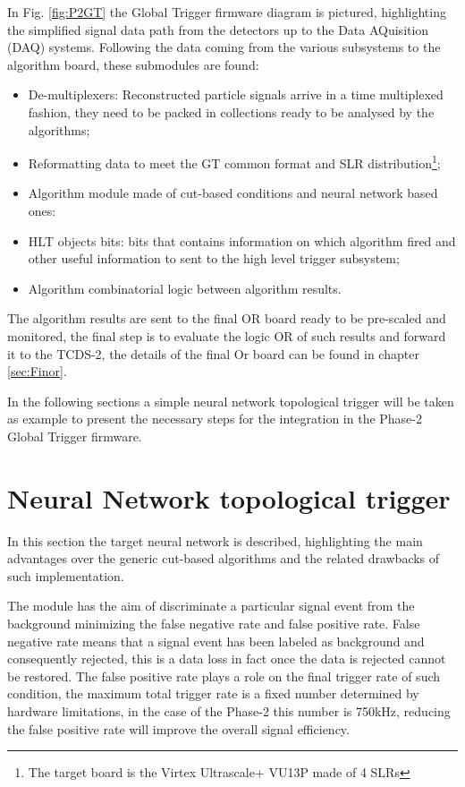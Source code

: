 \documentclass[../../main.tex]{subfiles}
\begin{document}
In Fig. \ref{fig:P2GT} the Global Trigger firmware diagram is pictured, highlighting the simplified signal data path from the detectors up to the Data AQuisition (DAQ) systems. Following the data coming from the various subsystems to the algorithm board, these submodules are found:
\begin{itemize}
    \item De-multiplexers: Reconstructed particle signals arrive in a time multiplexed fashion, they need to be packed in collections ready to be analysed by the algorithms;
    \item Reformatting data to meet the GT common format and SLR distribution\footnote{The target board is the Virtex Ultrascale+ VU13P made of 4 SLRs};
    \item Algorithm module made of cut-based conditions and neural network based ones:
    \item HLT objects bits: bits that contains information on which algorithm fired and other useful information to sent to the high level trigger subsystem;
    \item Algorithm combinatorial logic between algorithm results.
\end{itemize}
The algorithm results are sent to the final OR board ready to be pre-scaled and monitored, the final step is to evaluate the logic OR of such results and forward it to the TCDS-2, the details of the final Or board can be found in chapter \ref{sec:Finor}.



In the following sections a simple neural network topological trigger will be taken as example to present the necessary steps for the integration in the Phase-2 Global Trigger firmware. 
    
    
\section{Neural Network topological trigger}
\label{sec:P2GT_NN}

In this section the target neural network is described, highlighting the main advantages over the generic cut-based algorithms and the related drawbacks of such implementation.  

The module has the aim of discriminate a particular signal event from the background minimizing the false negative rate and false positive rate. False negative rate means that a signal event has been labeled as background and consequently rejected, this is a data loss in fact once the data is rejected cannot be restored. The false positive rate plays a role on the final trigger rate of such condition, the maximum total trigger rate is a fixed number determined by hardware limitations, in the case of the Phase-2 this number is 750kHz, reducing the false positive rate will improve the overall signal efficiency.     
\end{document}
